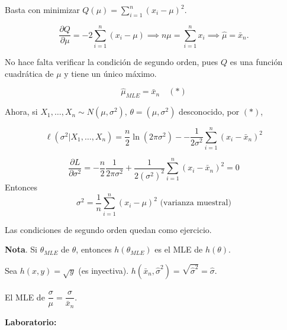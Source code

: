 \documentclass[
  12pt,
]{book}
\begin{document}
Basta con minimizar \(Q(\mu) = \sum_{i=1}^n(x_i-\mu)^2\).

\[ \dfrac{\partial Q}{\partial\mu} = -2\sum_{i=1}^n(x_i-\mu) \implies n\mu = \sum_{i=1}^nx_i \implies \hat\mu = \bar x_n.\]

No hace falta verificar la condición de segundo orden, pues \(Q\) es una función
cuadrática de \(\mu\) y tiene un único máximo.

\[ \hat\mu_{MLE} = \bar x_n \quad (*)\]

Ahora, si \(X_1,\dots, X_n \sim N(\mu,\sigma^2)\), \(\theta = (\mu,\sigma^2)\) desconocido, por \((*)\),

\[
\ell(\sigma^2|X_1,\dots, X_n) = \dfrac n2 \ln(2\pi\sigma^2)--\dfrac1{2\sigma^2}\sum_{i=1}^n(x_i-\bar
x_n)^2
\]

\[ \dfrac{\partial L}{\partial\sigma^2} = -\dfrac n2 \dfrac1{2\pi\sigma^2} + \dfrac1{2(\sigma^2)^2} \sum_{i=1}^n(x_i-\bar x_n)^2= 0 \]
Entonces
\[ \sigma^2 = \dfrac 1n \sum_{i=1}^n(x_i-\mu)^2 \text{ (varianza muestral)}\]

Las condiciones de segundo orden quedan como ejercicio.

\textbf{Nota}. Si \(\theta_{MLE}\) de \(\theta\), entonces \(h(\theta_{MLE})\) es el MLE de \(h(\theta)\).

Sea \(h(x,y) = \sqrt{y}\) (es inyectiva). \(h(\bar x_n, \hat\sigma^2) = \sqrt{\hat\sigma^2} = \hat\sigma\).

El MLE de \(\dfrac{\sigma}{\mu} = \dfrac{\hat \sigma}{\bar x_n}\).

\textbf{Laboratorio:}
\end{document}
